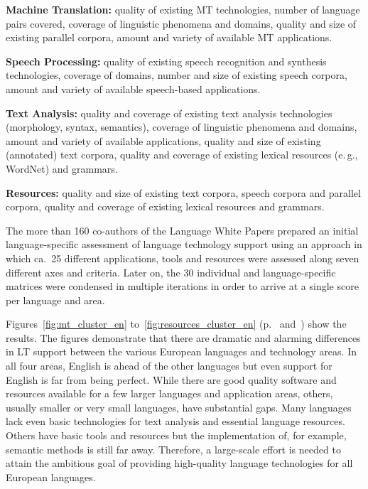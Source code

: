 \documentclass[10pt, plain]{../../metanetpaper}
\begin{document}
\begin{multicols}{2}
\textbf{Machine Translation:} quality of existing MT technologies, number of language pairs covered, coverage of linguistic phenomena and domains, quality and size of existing parallel corpora, amount and variety of available MT applications.

\textbf{Speech Processing:} quality of existing speech recognition and synthesis technologies, coverage of domains, number and size of existing speech corpora, amount and variety of available speech-based applications.

\textbf{Text Analysis:} quality and coverage of existing text analysis technologies (morphology, syntax, semantics), coverage of linguistic phenomena and domains, amount and variety of available applications, quality and size of existing (annotated) text corpora, quality and coverage of existing lexical resources (e.\,g., WordNet) and grammars.

\textbf{Resources:} quality and size of existing text corpora, speech corpora and parallel corpora, quality and coverage of existing lexical resources and grammars.

The more than 160 co-authors of the Language White Papers prepared an initial language-specific assessment of language technology support using an approach in which ca.~25 different applications, tools and resources were assessed along seven different axes and criteria. Later on, the 30 individual and language-specific matrices were condensed in multiple iterations in order to arrive at a single score per language and area. 

Figures~\ref{fig:mt_cluster_en} to~\ref{fig:resources_cluster_en} (p.~\pageref{fig:mt_cluster_en} and~\pageref{fig:resources_cluster_en}) show the results. The figures demonstrate that there are dramatic and alarming differences in LT support between the various European languages and technology areas. In all four areas, English is ahead of the other languages but even support for English is far from being perfect. While there are good quality software and resources available for a few larger languages and application areas, others, usually smaller or very small languages, have substantial gaps. Many languages lack even basic technologies for text analysis and essential language resources. Others have basic tools and resources but the implementation of, for example, semantic methods is still far away. Therefore, a large-scale effort is needed to attain the ambitious goal of providing high-quality language technologies for all European languages.


\end{multicols}
\end{document}
